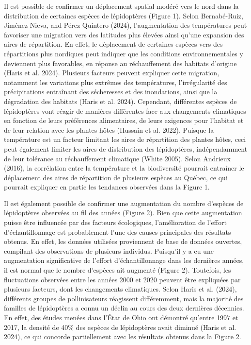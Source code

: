 \documentclass[9pt,twocolumn,twoside,]{pnas-new}
\begin{document}
Il est possible de confirmer un déplacement spatial modéré vers le nord
dans la distribution de certaines espèces de lépidoptères (Figure 1).
Selon Bernabé-Ruiz, Jiménez-Nieva, and Pérez-Quintero (2024),
l'augmentation des températures peut favoriser une migration vers des
latitudes plus élevées ainsi qu'une expansion des aires de répartition.
En effet, le déplacement de certaines espèces vers des répartitions plus
nordiques peut indiquer que les conditions environnementales y
deviennent plus favorables, en réponse au réchauffement des habitats
d'origine (Haris et al. 2024). Plusieurs facteurs peuvent expliquer
cette migration, notamment les variations plus extrêmes des
températures, l'irrégularité des précipitations entraînant des
sécheresses et des inondations, ainsi que la dégradation des habitats
(Haris et al. 2024). Cependant, différentes espèces de lépidoptères vont
réagir de manières différentes face aux changements climatiques en
fonction de leurs préférences alimentaires, de leurs exigences pour
l'habitat et de leur relation avec les plantes hôtes (Hussain et al.
2022). Puisque la température est un facteur limitant les aires de
répartition des plantes hôtes, ceci peut également limiter les aires de
distribution des lépidoptères, indépendamment de leur tolérance au
réchauffement climatique (White 2005). Selon Andrieux (2016), la
corrélation entre la température et la biodiversité pourrait entraîner
le déplacement des aires de répartition de plusieurs espèces au Québec,
ce qui pourrait expliquer en partie les tendances observées dans la
Figure 1.

Il est également possible de confirmer une augmentation du nombre
d'espèces de lépidoptères observées au fil des années (Figure 2). Bien
que cette augmentation puisse être influencée par des facteurs
écologiques, l'amélioration de l'effort d'échantillonnage est
probablement l'une des causes principales des résultats obtenus. En
effet, les données utilisées proviennent de base de données ouvertes,
compilant des observations de plusieurs individus. Puisqu'il y a eu une
augmentation significative de l'effort d'échantillonnage dans les
dernières années, il est normal que le nombre d'espèces ait augmenté
(Figure 2). Toutefois, les fluctuations observées entre les années 2000
et 2020 peuvent être expliquées par plusieurs facteurs, dont les
changements climatiques. Selon Haris et al. (2024), différents groupes
de pollinisateurs réagissent différemment, mais la majorité des familles
de lépidoptères a connu un déclin au cours des deux dernières décennies.
En effet, des études menées dans l'État de Ohio ont démontré qu'entre
1997 et 2017, la densité de 40\% des espèces de lépidoptères avait
diminué (Haris et al. 2024), ce qui concorde partiellement avec les
résultats obtenus dans la Figure 2.
\end{document}
